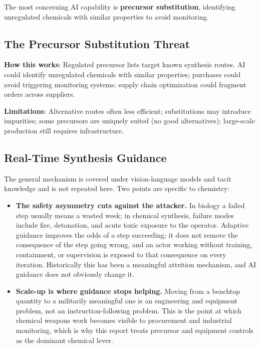 \documentclass[11pt,letterpaper]{article}
\begin{document}
The most concerning AI capability is \textbf{precursor substitution}, identifying unregulated chemicals with similar properties to avoid monitoring.

\subsection{The Precursor Substitution Threat}

\textbf{How this works}: Regulated precursor lists target known synthesis routes. AI could identify unregulated chemicals with similar properties; purchases could avoid triggering monitoring systems; supply chain optimization could fragment orders across suppliers.

\textbf{Limitations}: Alternative routes often less efficient; substitutions may introduce impurities; some precursors are uniquely suited (no good alternatives); large-scale production still requires infrastructure.

\subsection{Real-Time Synthesis Guidance}

The general mechanism is covered under vision-language models and tacit knowledge and is not repeated here. Two points are specific to chemistry:

\begin{itemize}[nosep]
  \item \textbf{The safety asymmetry cuts against the attacker.} In biology a failed step usually means a wasted week; in chemical synthesis, failure modes include fire, detonation, and acute toxic exposure to the operator. Adaptive guidance improves the odds of a step succeeding; it does not remove the consequence of the step going wrong, and an actor working without training, containment, or supervision is exposed to that consequence on every iteration. Historically this has been a meaningful attrition mechanism, and AI guidance does not obviously change it.
  \item \textbf{Scale-up is where guidance stops helping.} Moving from a benchtop quantity to a militarily meaningful one is an engineering and equipment problem, not an instruction-following problem. This is the point at which chemical weapons work becomes visible to procurement and industrial monitoring, which is why this report treats precursor and equipment controls as the dominant chemical lever.
\end{itemize}
\end{document}
